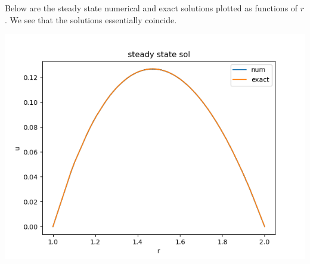 \documentclass{article}
\begin{document}
\begin{enumerate}[label=(\alph*)]
Below are the steady state numerical and exact solutions plotted as functions of $r$. We see that the solutions essentially coincide.

\begin{center}
	\includegraphics[scale=.6]{hw10 steady state sol}
\end{center}

\end{enumerate}


	
\end{document}
